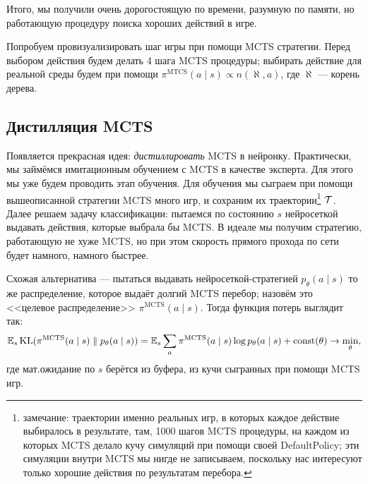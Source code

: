 Итого, мы получили очень дорогостоящую по времени, разумную по памяти, но работающую процедуру поиска хороших действий в игре.

\begin{exampleBox}[label=ex:mcts]{}
Попробуем провизуализировать шаг игры при помощи MCTS стратегии. Перед выбором действия будем делать 4 шага MCTS процедуры; выбирать действие для реальной среды будем при помощи $\pi^{\mathrm{MTCS}}(a \mid s) \propto n(\aleph, a)$, где $\aleph$ --- корень дерева.

\begin{center}
\end{center}
\end{exampleBox}

\subsection{Дистилляция MCTS}

Появляется прекрасная идея: \emph{дистиллировать} MCTS в нейронку. Практически, мы займёмся имитационным обучением с MCTS в качестве эксперта. Для этого мы уже будем проводить этап обучения. Для обучения мы сыграем при помощи вышеописанной стратегии MCTS много игр, и сохраним их траектории\footnote{замечание: траектории именно реальных игр, в которых каждое действие выбиралось в результате, там, 1000 шагов MCTS процедуры, на каждом из которых MCTS делало кучу симуляций при помощи своей DefaultPolicy; эти симуляции внутри MCTS мы нигде не записываем, поскольку нас интересуют только хорошие действия по результатам перебора.} $\mathcal{T}$. Далее решаем задачу классификации: пытаемся по состоянию $s$ нейросеткой выдавать действия, которые выбрала бы MCTS. В идеале мы получим стратегию, работающую не хуже MCTS, но при этом скорость прямого прохода по сети будет намного, намного быстрее.

Схожая альтернатива --- пытаться выдавать нейросеткой-стратегией $p_{\theta}(a \mid s)$ то же распределение, которое выдаёт долгий MCTS перебор; назовём это <<целевое распределение>> $\pi^{\mathrm{MCTS}}(a \mid s)$. Тогда функция потерь выглядит так:
\begin{equation}\label{distill_mcts}
\mathbb{E}_{s} \operatorname{KL}(\pi^{\mathrm{MCTS}}(a \mid s) \parallel p_{\theta}(a \mid s)) = \mathbb{E}_{s} \sum_a \pi^{\mathrm{MCTS}}(a \mid s) \log p_{\theta}(a \mid s) + \operatorname{const}(\theta) \to \min_{\theta},
\end{equation}
где мат.ожидание по $s$ берётся из буфера, из кучи сыгранных при помощи MCTS игр.

